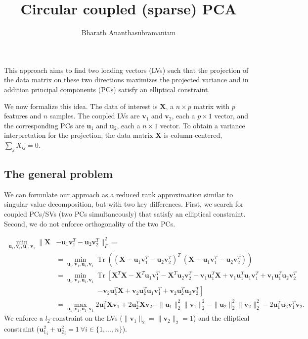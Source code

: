 \documentclass[10pt,a4paper]{article}
\author{Bharath Ananthasubramaniam}
\title{Circular coupled (sparse) PCA}
\DeclareMathOperator{\Tr}{Tr}
\newcommand{\bu}{\mathbf{u}}
\newcommand{\bv}{\mathbf{v}}
\newcommand{\bX}{\mathbf{X}}
\begin{document}
\maketitle
This approach aims to find two loading vectors (LVs) such that the projection of the data matrix  on these two directions maximizes the projected variance and in addition principal components (PCs) satisfy an elliptical constraint.

We now formalize this idea. The data of interest is $\textbf{X}$, a $n\times p$ matrix with $p$ features and $n$ samples. The coupled LVs are $\textbf{v}_1$ and $\textbf{v}_2$, each a $p\times 1$ vector, and the corresponding PCs are $\textbf{u}_1$ and $\textbf{u}_2$, each a $n \times 1$ vector. To obtain a variance interpretation for the projection, the data matrix $\textbf{X}$ is column-centered, $\sum_j X_{ij} = 0$.

\subsection*{The general problem}

We can formulate our approach as a reduced rank approximation similar to singular value decomposition, but with two key differences. First, we search for coupled PCs/SVs (two PCs simultaneously) that satisfy an elliptical constraint. Second, we do not enforce orthogonality of the two PCs.

\begin{align*}
\min_{\mathbf{u}_1, \mathbf{v}_1, \mathbf{u}_1, \mathbf{v}_1} \| \mathbf{X} &- \mathbf{u}_1\mathbf{v}_1^T - \mathbf{u}_2\mathbf{v}_2^T\|_F^2 = \\
  &= \min_{\mathbf{u}_1, \mathbf{v}_1, \mathbf{u}_1, \mathbf{v}_1} \Tr \left((\mathbf{X} - \mathbf{u}_1\mathbf{v}_1^T - \mathbf{u}_2\mathbf{v}_2^T)^T~(\mathbf{X} - \mathbf{u}_1\mathbf{v}_1^T - \mathbf{u}_2\mathbf{v}_2^T) \right)\\
  &= \min_{\mathbf{u}_1, \mathbf{v}_1, \mathbf{u}_1, \mathbf{v}_1} \Tr \left[\bX^T\bX - \bX^T \bu_1 \bv_1^T - \bX^T \bu_2\bv_2^T - \bv_1\bu_1^T\bX + \bv_1\bu_1^T \bu_1\bv_1^T + \bv_1\bu_1^T \bu_2\bv_2^T \right. \\
  & \qquad \qquad\qquad \left. -\bv_2\bu_2^T\bX + \bv_2\bu_2^T \bu_1 \bv_1^T + \bv_2\bu_2^T \bu_2\bv_2^T\right]\\
  &= \max_{\mathbf{u}_1, \mathbf{v}_1, \mathbf{u}_1, \mathbf{v}_1} 2\bu_1^T\bX\bv_1 + 2\bu_2^T\bX\bv_2 - \|\bu_1\|_2^2 \|\bv_1\|_2^2 - \|\bu_2\|_2^2 \|\bv_2\|_2^2 - 2\bu_1^T\bu_2\bv_1^T\bv_2.
\end{align*}
We enforce a $l_2$-constraint on the LVs ($\|\bv_1\|_2 = \|\bv_2\|_2 = 1$) and the elliptical constraint (${\bu_1^2}_i + {\bu_2^2}_i = 1~ \forall i\in \{1,\ldots,n\}$).
\end{document}
